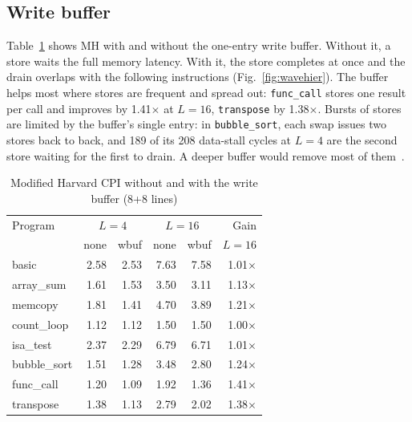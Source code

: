 \documentclass[conference]{IEEEtran}
\begin{document}
\subsection{Write buffer}
Table~\ref{tab:wbuf} shows MH with and without the one-entry write buffer.
Without it, a store waits the full memory latency. With it, the store
completes at once and the drain overlaps with the following instructions
(Fig.~\ref{fig:wavehier}). The buffer helps most where stores are frequent
and spread out: \texttt{func\_call} stores one result per call and improves
by 1.41$\times$ at $L=16$, \texttt{transpose} by 1.38$\times$. Bursts of
stores are limited by the buffer's single entry: in \texttt{bubble\_sort},
each swap issues two stores back to back, and 189 of its 208 data-stall
cycles at $L=4$ are the second store waiting for the first to drain. A
deeper buffer would remove most of them~\cite{jouppi1993}.

\begin{table}[t]
\caption{Modified Harvard CPI without and with the write buffer (8+8 lines)}
\label{tab:wbuf}
\centering
\setlength{\tabcolsep}{4pt}
\begin{tabular}{lrrrrr}
\toprule
Program & \multicolumn{2}{c}{$L=4$} & \multicolumn{2}{c}{$L=16$} & Gain \\
 & none & wbuf & none & wbuf & $L{=}16$ \\
\midrule
basic        & 2.58 & 2.53 & 7.63 & 7.58 & 1.01$\times$ \\
array\_sum   & 1.61 & 1.53 & 3.50 & 3.11 & 1.13$\times$ \\
memcopy      & 1.81 & 1.41 & 4.70 & 3.89 & 1.21$\times$ \\
count\_loop  & 1.12 & 1.12 & 1.50 & 1.50 & 1.00$\times$ \\
isa\_test    & 2.37 & 2.29 & 6.79 & 6.71 & 1.01$\times$ \\
bubble\_sort & 1.51 & 1.28 & 3.48 & 2.80 & 1.24$\times$ \\
func\_call   & 1.20 & 1.09 & 1.92 & 1.36 & 1.41$\times$ \\
transpose    & 1.38 & 1.13 & 2.79 & 2.02 & 1.38$\times$ \\
\bottomrule
\end{tabular}
\end{table}
\end{document}

